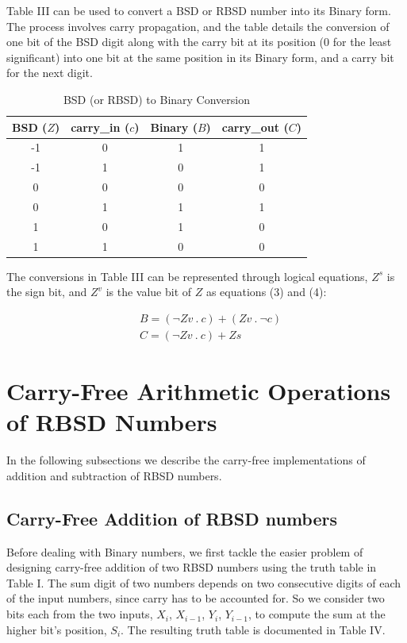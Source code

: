 \documentclass[conference]{IEEEtran}
\begin{document}
Table III can be used to convert a BSD or RBSD number into its Binary form. The process involves carry propagation, and the table details the conversion of one bit of the BSD digit along with the carry bit at its position (0 for the least significant) into one bit at the same position in its Binary form, and a carry bit for the next digit.

\vspace{-.5em}
\begin{table}[h!]
  \centering
  \caption{BSD (or RBSD) to Binary Conversion}
  \label{tab:table3}
  \begin{tabular}{|c|c||c|c|}
    \hline
    BSD ($Z$) & carry\_in ($c$) & Binary ($B$) & carry\_out ($C$) \\
    \hline
    \hline
    -1 & 0 & 1 & 1\\
    \hline
    -1 & 1 & 0 & 1\\
    \hline
    0 & 0 & 0 & 0\\
    \hline
    0 & 1 & 1 & 1\\
    \hline
    1 & 0 & 1 & 0\\
    \hline
    1 & 1 & 0 & 0\\
    \hline
  \end{tabular}
\end{table}

The conversions in Table III can be represented through logical equations, $Z^{s}$ is the sign bit, and $Z^{v}$ is the value bit of $Z$ as equations (3) and (4):

\vspace{-1em}
\begin{align}
&B = (\neg Zv \ . \ c) + (Zv \ . \ \neg c) \\
&C = (\neg Zv \ . \ c) + Zs
\end{align}

\section{Carry-Free Arithmetic Operations of RBSD Numbers}

In the following subsections we describe the carry-free implementations of addition and subtraction of RBSD numbers.

\subsection{Carry-Free Addition of RBSD numbers}

Before dealing with Binary numbers, we first tackle the easier problem of designing carry-free addition of two RBSD numbers using the truth table in Table I. The sum digit of two numbers depends on two consecutive digits of each of the input numbers, since carry has to be accounted for. So we consider two bits each from the two inputs, $X_{i}$, $X_{i-1}$, $Y_{i}$, $Y_{i-1}$, to compute the sum at the higher bit’s position, $S_{i}$. The resulting truth table is documented in Table IV.
\end{document}
